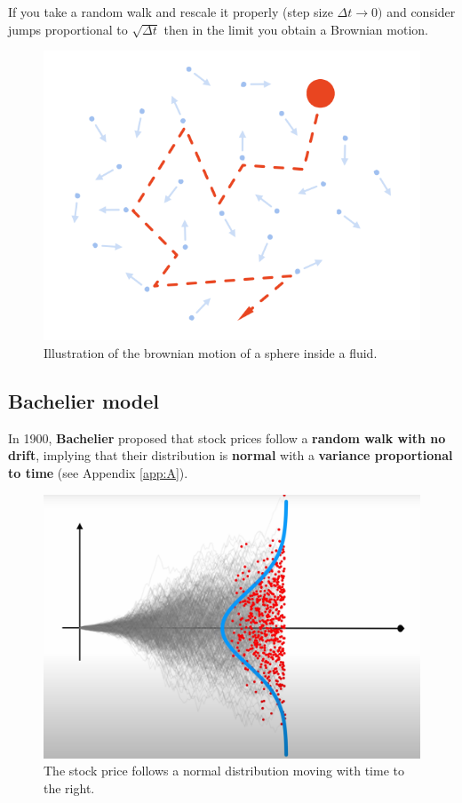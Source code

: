 If you take a random walk and rescale it properly (step size $\Delta t \to 0)$ and consider jumps proportional to $\sqrt{\Delta t}$ then in the limit you obtain a Brownian motion.

\begin{figure} [H]
    \centering
    \includegraphics[width=0.5\linewidth]{img/brownian_motion.png}
    \caption{Illustration of the brownian motion of a sphere inside a fluid.}
\end{figure}

\subsection{Bachelier model}
In 1900, \textbf{Bachelier} proposed that stock prices follow a \textbf{random walk with no drift}, implying that their distribution is \textbf{normal} with a \textbf{variance proportional to time} (see Appendix \ref{app:A}).
\begin{figure} [H]
\centering
\includegraphics[width=0.5\linewidth]{img/Bachelier.png}
\caption{The stock price follows a normal distribution moving with time to the right.}
\end{figure}

